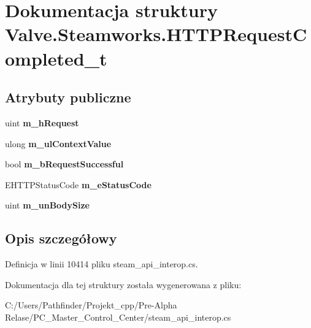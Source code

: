 \hypertarget{struct_valve_1_1_steamworks_1_1_h_t_t_p_request_completed__t}{}\section{Dokumentacja struktury Valve.\+Steamworks.\+H\+T\+T\+P\+Request\+Completed\+\_\+t}
\label{struct_valve_1_1_steamworks_1_1_h_t_t_p_request_completed__t}
\subsection*{Atrybuty publiczne}
\begin{DoxyCompactItemize}
\item 
\mbox{\label{struct_valve_1_1_steamworks_1_1_h_t_t_p_request_completed__t_ae0963058487572e9200642667772dfdf}} 
uint {\bfseries m\+\_\+h\+Request}
\item 
\mbox{\label{struct_valve_1_1_steamworks_1_1_h_t_t_p_request_completed__t_a7b575ecd2f3d2cd9f58b423782f46395}} 
ulong {\bfseries m\+\_\+ul\+Context\+Value}
\item 
\mbox{\label{struct_valve_1_1_steamworks_1_1_h_t_t_p_request_completed__t_a49ca5fd27bab2fba6837bb70ccb6bca1}} 
bool {\bfseries m\+\_\+b\+Request\+Successful}
\item 
\mbox{\label{struct_valve_1_1_steamworks_1_1_h_t_t_p_request_completed__t_aeaff54a1ea0a44b0e5faa0eeff59d601}} 
E\+H\+T\+T\+P\+Status\+Code {\bfseries m\+\_\+e\+Status\+Code}
\item 
\mbox{\label{struct_valve_1_1_steamworks_1_1_h_t_t_p_request_completed__t_accd2a94e999addf02151483dd6761ab5}} 
uint {\bfseries m\+\_\+un\+Body\+Size}
\end{DoxyCompactItemize}


\subsection{Opis szczegółowy}


Definicja w linii 10414 pliku steam\+\_\+api\+\_\+interop.\+cs.



Dokumentacja dla tej struktury została wygenerowana z pliku\+:\begin{DoxyCompactItemize}
\item 
C\+:/\+Users/\+Pathfinder/\+Projekt\+\_\+cpp/\+Pre-\/\+Alpha Relase/\+P\+C\+\_\+\+Master\+\_\+\+Control\+\_\+\+Center/steam\+\_\+api\+\_\+interop.\+cs\end{DoxyCompactItemize}
